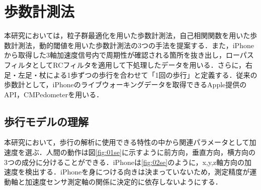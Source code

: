 \chapter{歩数計測法}
本研究においては，粒子群最適化を用いた歩数計測法，自己相関関数を用いた歩数計測法，動的閾値を用いた歩数計測法の3つの手法を提案する．また，iPhoneから取得した3軸加速度信号内で周期性が確認される箇所を抜き出し，ローパスフィルタとしてRCフィルタを適用して下処理したデータを用いる．さらに，右足・左足・杖による1歩ずつの歩行を合わせて「1回の歩行」と定義する．従来の歩数計として，iPhoneのライブウォーキングデータを取得できるApple提供のAPI，CMPedometerを用いる．

\section{歩行モデルの理解}
本研究において，歩行の解析に使用できる特性の中から関連パラメータとして加速度を選ぶ．人間の動作は図\ref{fig:01se}に示すように前方向，垂直方向，横方向の3つの成分に分けることができる．iPhoneは\ref{fig:02se}のように，x,y,z軸方向の加速度を検出する．iPhoneを身につける向きは決まっていないため，測定精度が運動軸と加速度センサ測定軸の関係に決定的に依存しないようにする．

